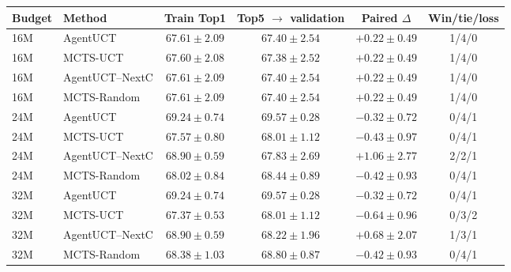 \begin{tabular}{llcccc}
\toprule
Budget & Method & Train Top1 & Top5 $\to$ validation & Paired $\Delta$ & Win/tie/loss\\
\midrule
16M & AgentUCT & $67.61\pm2.09$ & $67.40\pm2.54$ & $+0.22\pm0.49$ & 1/4/0\\
16M & MCTS-UCT & $67.60\pm2.08$ & $67.38\pm2.52$ & $+0.22\pm0.49$ & 1/4/0\\
16M & AgentUCT--NextC & $67.61\pm2.09$ & $67.40\pm2.54$ & $+0.22\pm0.49$ & 1/4/0\\
16M & MCTS-Random & $67.61\pm2.09$ & $67.40\pm2.54$ & $+0.22\pm0.49$ & 1/4/0\\
\midrule
24M & AgentUCT & $69.24\pm0.74$ & $69.57\pm0.28$ & $-0.32\pm0.72$ & 0/4/1\\
24M & MCTS-UCT & $67.57\pm0.80$ & $68.01\pm1.12$ & $-0.43\pm0.97$ & 0/4/1\\
24M & AgentUCT--NextC & $68.90\pm0.59$ & $67.83\pm2.69$ & $+1.06\pm2.77$ & 2/2/1\\
24M & MCTS-Random & $68.02\pm0.84$ & $68.44\pm0.89$ & $-0.42\pm0.93$ & 0/4/1\\
\midrule
32M & AgentUCT & $69.24\pm0.74$ & $69.57\pm0.28$ & $-0.32\pm0.72$ & 0/4/1\\
32M & MCTS-UCT & $67.37\pm0.53$ & $68.01\pm1.12$ & $-0.64\pm0.96$ & 0/3/2\\
32M & AgentUCT--NextC & $68.90\pm0.59$ & $68.22\pm1.96$ & $+0.68\pm2.07$ & 1/3/1\\
32M & MCTS-Random & $68.38\pm1.03$ & $68.80\pm0.87$ & $-0.42\pm0.93$ & 0/4/1\\
\bottomrule
\end{tabular}
